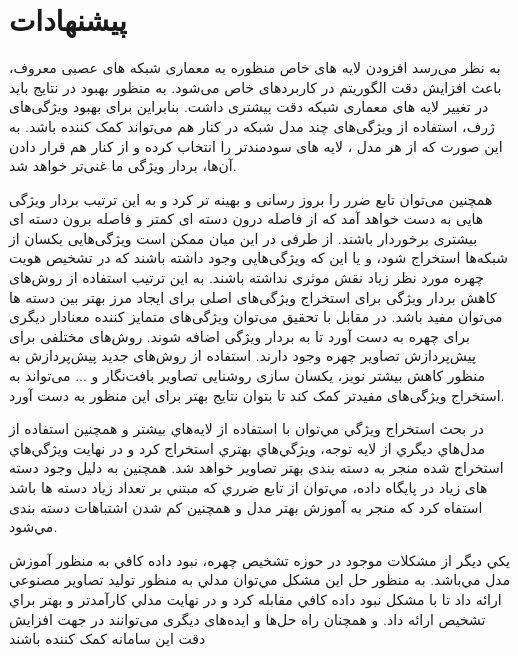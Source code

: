 \section{پیشنهادات}
به نظر می‌رسد افزودن لایه های خاص منظوره به معماری شبکه های عصبی معروف‌‌، باعث افزایش دقت الگوریتم در کاربردهای خاص می‌شود. به منظور بهبود در نتایج باید در تغییر لایه های معماری شبکه دقت بیشتری داشت. بنابراین برای بهبود ویژگی‌های ژرف، استفاده از ویژگی‌های چند مدل شبکه در کنار هم می‌تواند کمک کننده باشد. به این صورت که از هر مدل ‌، لایه های سودمندتر را انتخاب کرده و از کنار هم قرار دادن آن‌ها، بردار ویژگی ما غنی‌تر خواهد شد. 

همچنین می‌توان تابع ضرر را بروز رسانی و بهینه تر ‌کرد و به این ترتیب بردار ویژگی هایی به دست خواهد آمد که از فاصله درون دسته ای کمتر و فاصله برون دسته ای بیشتری برخوردار باشند. از طرفی در این میان ممکن است ویژگی‌هایی یکسان از شبکه‌ها استخراج شود، و یا این که ویژگی‌هایی وجود داشته باشند که در تشخیص هویت چهره مورد نظر زیاد نقش موثری نداشته باشند. به این ترتیب استفاده از روش‌های کاهش بردار ویژگی برای استخراج ویژگی‌های اصلی برای ایجاد مرز بهتر بین دسته ها‌ می‌توان مفید باشد.
\noindent
در مقابل با تحقیق می‌توان ویژگی‌های متمایز کننده معنادار دیگری برای چهره به دست آورد تا به بردار ویژگی اضافه شوند. روش‌های مختلفی برای پیش‌پردازش تصاویر چهره وجود دارند. استفاده از روش‌های جدید پیش‌پردازش به منظور کاهش بیشتر نویز، یکسان‌ سازی روشنایی تصاویر بافت‌نگار و ... می‌تواند به استخراج ویژگی‌های مفیدتر کمک کند تا بتوان نتایج بهتر برای این منظور به دست آورد.

در بحث استخراج ويژگي مي‌توان با استفاده از لايه‌هاي بيشتر و همچنين استفاده از مدل‌هاي ديگري از لايه توجه، ويژگي‌هاي بهتري استخراج كرد و در نهايت ويژگي‌هاي استخراج شده منجر به دسته بندی بهتر تصاویر خواهد شد. همچنين به دليل وجود دسته های زیاد در پايگاه داده، مي‌توان از تابع ضرري كه مبتني بر تعداد زیاد دسته ها باشد استفاه كرد كه منجر به آموزش بهتر مدل و همچنين كم شدن اشتباهات دسته بندی مي‌شود.

يكي ديگر از مشكلات موجود در حوزه تشخيص چهره، نبود داده كافي به منظور آموزش مدل مي‌باشد. به منظور حل اين مشكل مي‌توان مدلي به منظور توليد تصاویر مصنوعي ارائه داد تا با مشكل نبود داده كافي مقابله كرد و در نهايت مدلي كارآمدتر و بهتر براي تشخيص ارائه داد. و همچنان راه حل‌ها و ایده‌های دیگری می‌توانند در جهت افزایش دقت این سامانه کمک کننده باشند